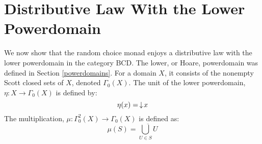 %
%
%

\section{Distributive Law With the Lower Powerdomain}

We now show that the random choice monad enjoys a distributive law with the lower powerdomain in the category \textsf{BCD}.  The lower, or Hoare, powerdomain was defined in Section \ref{powerdomains}.  For a domain $X$, it consists of the nonempty Scott closed sets of $X$, denoted $\Gamma_{0}(X)$.  The unit of the lower powerdomain, $\eta:X\to \Gamma_{0}(X)$ is defined by: \[\eta(x) = \,\downarrow\! x\]
The multiplication, $\mu:\Gamma_{0}^2(X)\to \Gamma_{0}(X)$ is defined as: \[\mu(S) = \overline{\bigcup_{U\in S} U}\]


